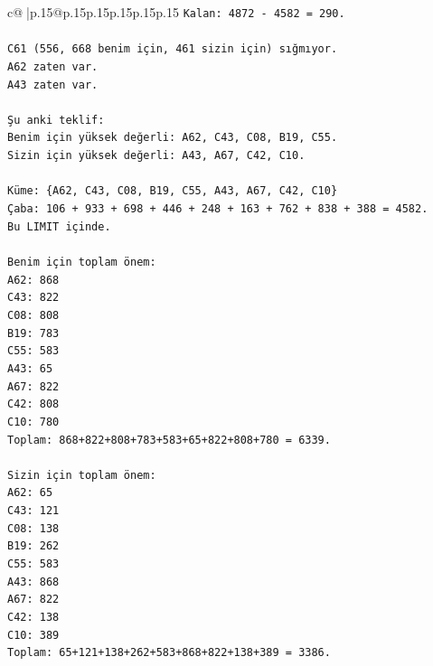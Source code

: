 \documentclass{article}
\begin{document}
{\begin{supertabular}{c@{$\;$}|p{.15\linewidth}@{}p{.15\linewidth}p{.15\linewidth}p{.15\linewidth}p{.15\linewidth}p{.15\linewidth}}
{{{\texttt{Kalan: 4872 {-} 4582 = 290.} \\
\\ 
\texttt{C61 (556, 668 benim için, 461 sizin için) sığmıyor.} \\
\texttt{A62 zaten var.} \\
\texttt{A43 zaten var.} \\
\\ 
\texttt{Şu anki teklif:} \\
\texttt{Benim için yüksek değerli: A62, C43, C08, B19, C55.} \\
\texttt{Sizin için yüksek değerli: A43, A67, C42, C10.} \\
\\ 
\texttt{Küme: \{A62, C43, C08, B19, C55, A43, A67, C42, C10\}} \\
\texttt{Çaba: 106 + 933 + 698 + 446 + 248 + 163 + 762 + 838 + 388 = 4582.} \\
\texttt{Bu LIMIT içinde.} \\
\\ 
\texttt{Benim için toplam önem:} \\
\texttt{A62: 868} \\
\texttt{C43: 822} \\
\texttt{C08: 808} \\
\texttt{B19: 783} \\
\texttt{C55: 583} \\
\texttt{A43: 65} \\
\texttt{A67: 822} \\
\texttt{C42: 808} \\
\texttt{C10: 780} \\
\texttt{Toplam: 868+822+808+783+583+65+822+808+780 = 6339.} \\
\\ 
\texttt{Sizin için toplam önem:} \\
\texttt{A62: 65} \\
\texttt{C43: 121} \\
\texttt{C08: 138} \\
\texttt{B19: 262} \\
\texttt{C55: 583} \\
\texttt{A43: 868} \\
\texttt{A67: 822} \\
\texttt{C42: 138} \\
\texttt{C10: 389} \\
\texttt{Toplam: 65+121+138+262+583+868+822+138+389 = 3386.} \\
\\ 
}}}
\end{supertabular}}
\end{document}
